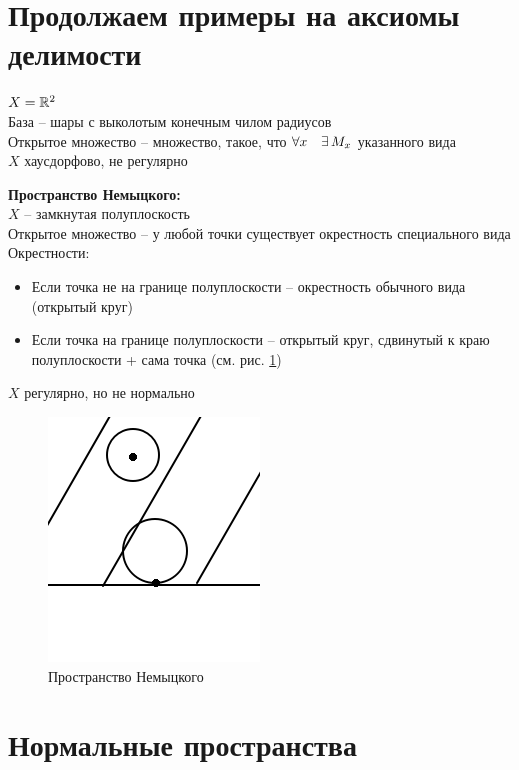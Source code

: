 \section{Продолжаем примеры на аксиомы делимости}

\begin{exmpls}
	\item $ X = \mathbb{R}^2 $ \\
    База -- шары с выколотым конечным чилом радиусов \\
    Открытое множество -- множество, такое, что $ \forall x \quad \exists\, M_x $ указанного вида \\
    $ X $ хаусдорфово, не регулярно
    \item \textbf{Пространство Немыцкого:} \\
    $ X $ -- замкнутая полуплоскость \\
    Открытое множество -- у любой точки существует окрестность специального вида \\
    Окрестности:
    \begin{itemize}
    	\item Если точка не на границе полуплоскости -- окрестность обычного вида (открытый круг)
        \item Если точка на границе полуплоскости -- открытый круг, сдвинутый к краю полуплоскости + сама точка (см. рис. \ref{fig:1})
    \end{itemize}
    $ X $ регулярно, но не нормально
\end{exmpls}

\begin{figure}[!ht]
    \includegraphics[scale=0.8]{nemyz}
    \caption{Пространство Немыцкого}
    \label{fig:1}
\end{figure}

\section{Нормальные пространства}

